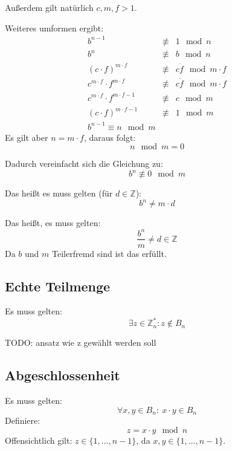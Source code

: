 \documentclass[DIN, pagenumber=false, fontsize=11pt, parskip=half]{scrartcl}
\begin{document}
    Außerdem gilt natürlich $c, m, f > 1$.

    Weiteres umformen ergibt:
    \begin{eqnarray}
        b^{n-1} &\not\equiv& 1 \mod n \\
        b^{n} &\not\equiv& b \mod n \\
        {\left(c \cdot f \right)}^{m \cdot f} &\not\equiv& c \dot f \mod m \cdot f \\
        c^{m \cdot f} \cdot f^{m \cdot f} &\not\equiv& c \dot f \mod m \cdot f \\
        c^{m \cdot f} \cdot f^{m \cdot f - 1} &\not\equiv& c \mod m \\
        {\left(c \cdot f\right)}^{m \cdot f -1} &\not\equiv& 1 \mod m \\
        b^{n-1} \equiv n \mod m
    \end{eqnarray}
    Es gilt aber $n = m \cdot f$, daraus folgt:
    \begin{equation}
        n \mod m = 0
    \end{equation}

    Dadurch vereinfacht sich die Gleichung zu:
    \begin{equation}
        b^n \not\equiv 0 \mod m
    \end{equation}

    Das heißt es muss gelten (für $d \in \mathbb{Z}$):
    \begin{equation}
        b^n \neq m \cdot d
    \end{equation}

    Das heißt, es muss gelten:
    \begin{equation}
        \frac{b^n}{m} \neq d \in \mathbb{Z}
    \end{equation}
    Da $b$ und $m$ Teilerfremd sind ist das erfüllt. 

    \subsection{Echte Teilmenge}
    Es muss gelten:
    \begin{equation}
        \exists z \in \mathbb{Z}^*_n: z \notin B_n
    \end{equation}

    TODO: ansatz wie z gewählt werden soll

    \subsection{Abgeschlossenheit}
    Es muss gelten:
    \begin{equation}
        \forall x, y \in B_n:\ x \cdot y \in B_n
    \end{equation}
    Definiere:
    \begin{equation}
        z = x \cdot y \mod n
    \end{equation}
    Offensichtlich gilt: $z \in \{1, \ldots, n-1\}$, da $x, y \in \{1, \ldots, n-1\}$.
\end{document}
